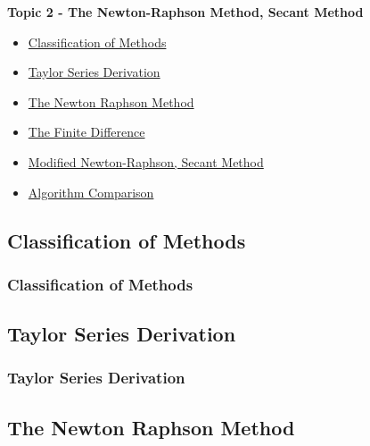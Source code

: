 \documentclass[fleqn]{beamer} %
\newcommand{\sectionIItitle}{The Newton-Raphson Method, Secant Method}
\newcommand{\sectionIIsubsectionItitle}{Classification of Methods}
\newcommand{\sectionIIsubsectionIItitle}{Taylor Series Derivation}
\newcommand{\sectionIIsubsectionIIItitle}{The Newton Raphson Method}
\newcommand{\sectionIIsubsectionIVtitle}{The Finite Difference}
\newcommand{\sectionIIsubsectionVtitle}{Modified Newton-Raphson, Secant Method}
\newcommand{\sectionIIsubsectionVItitle}{Algorithm Comparison}
\begin{document}
		\begin{frame}
			\large \textbf{Topic 2 - \sectionIItitle} \vspace{3mm}\\

			\begin{itemize}
				\item \hyperlink{sectionIIsubsectionI}{\sectionIIsubsectionItitle} \vspc %
				\item \hyperlink{sectionIIsubsectionII}{\sectionIIsubsectionIItitle} \vspc %
				\item \hyperlink{sectionIIsubsectionIII}{\sectionIIsubsectionIIItitle} \vspc %
				\item \hyperlink{sectionIIsubsectionIV}{\sectionIIsubsectionIVtitle} \vspc %
				\item \hyperlink{sectionIIsubsectionV}{\sectionIIsubsectionVtitle} \vspc %
				\item \hyperlink{sectionIIsubsectionVI}{\sectionIIsubsectionVItitle} \vspc %
			\end{itemize}

		\end{frame}

		\subsection{\sectionIIsubsectionItitle}\label{sectionIIsubsectionI}

			\begin{frame}[label=sectionIIsubsectionI]
				\frametitle{\sectionIIsubsectionItitle}
				\bigskip

				\btVFill
			\end{frame}

		\subsection{\sectionIIsubsectionIItitle}\label{sectionIIsubsectionII}

			\begin{frame}
				\frametitle{\sectionIIsubsectionIItitle}
				\bigskip

				\btVFill 
			\end{frame}	

		\subsection{\sectionIIsubsectionIIItitle}\label{sectionIIsubsectionIII}
\end{document}

